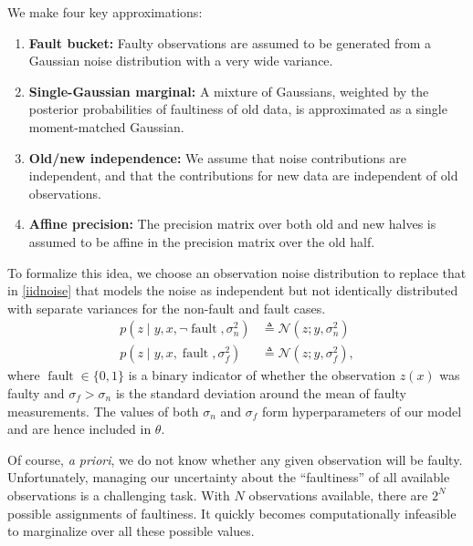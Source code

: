 \documentclass{article}
\newcommand{\deq}{\ensuremath{\triangleq}}
\newcommand{\given}{\ensuremath{\mid}}
\newcommand{\cm}[1]{\ensuremath{\mathcal{#1}}}
\DeclareMathOperator{\fault}{fault}
\begin{document}
We make four key approximations:
\begin{enumerate}
 \item \label{app:fb} {\bf Fault bucket:} Faulty observations are assumed to be generated from a Gaussian noise distribution with a very wide variance.
\item \label{app:single_gaussian} {\bf Single-Gaussian marginal:} A mixture of Gaussians, weighted by the posterior probabilities of faultiness of old data, is approximated as a single moment-matched Gaussian.
\item \label{app:independence} {\bf Old/new independence:} We assume that noise contributions are independent, and that the contributions for new data are independent of old observations.
\item \label{app:affine} {\bf Affine precision:} The precision matrix over both old and new halves is assumed to be affine in the precision matrix over the old half.
\end{enumerate}

To formalize this idea, we choose an observation noise distribution to
replace that in \eqref{iidnoise} that models the noise as independent
but not identically distributed with separate variances for the
non-fault and fault cases.
\begin{align*}
 p(z \given y, x, \neg\fault, \sigma_n^2)
 &
 \deq
 \cm{N}(z; y, \sigma_n^2)
 \\
 p(z \given y, x, \fault, \sigma_f^2)
 &
 \deq
 \cm{N}(z; y, \sigma_f^2),
\end{align*}
where $\fault \in \lbrace 0, 1 \rbrace$ is a binary indicator of
whether the observation $z(x)$ was faulty and $\sigma_f > \sigma_n$ is
the standard deviation around the mean of faulty measurements.  The
values of both $\sigma_n$ and $\sigma_f$ form hyperparameters of our
model and are hence included in $\theta$.

Of course, {\it a priori}, we do not know whether any given
observation will be faulty.  Unfortunately, managing our uncertainty
about the ``faultiness'' of all available observations is a
challenging task. With $N$ observations available, there are $2^N$
possible assignments of faultiness. It quickly becomes computationally
infeasible to marginalize over all these possible values.
\end{document}
